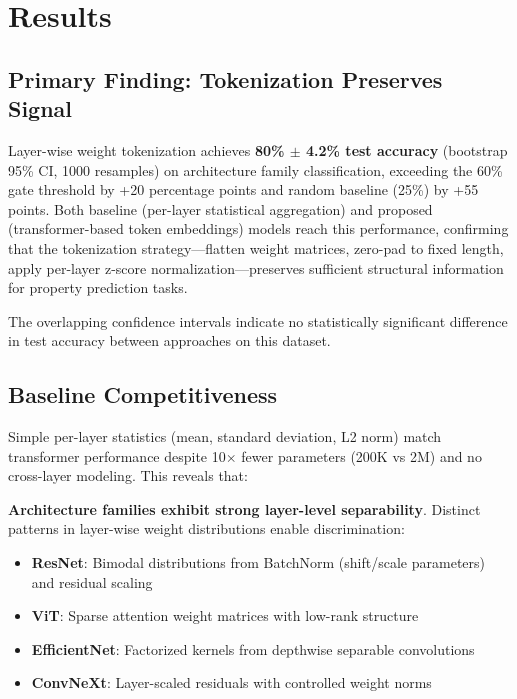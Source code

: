 \section{Results}

\subsection{Primary Finding: Tokenization Preserves Signal}

Layer-wise weight tokenization achieves \textbf{80\% $\pm$ 4.2\% test accuracy} (bootstrap 95\% CI, 1000 resamples) on architecture family classification, exceeding the 60\% gate threshold by +20 percentage points and random baseline (25\%) by +55 points. Both baseline (per-layer statistical aggregation) and proposed (transformer-based token embeddings) models reach this performance, confirming that the tokenization strategy---flatten weight matrices, zero-pad to fixed length, apply per-layer z-score normalization---preserves sufficient structural information for property prediction tasks.

The overlapping confidence intervals indicate no statistically significant difference in test accuracy between approaches on this dataset.

\subsection{Baseline Competitiveness}

Simple per-layer statistics (mean, standard deviation, L2 norm) match transformer performance despite 10$\times$ fewer parameters (200K vs 2M) and no cross-layer modeling. This reveals that:

\textbf{Architecture families exhibit strong layer-level separability}. Distinct patterns in layer-wise weight distributions enable discrimination:

\begin{itemize}
\item \textbf{ResNet}: Bimodal distributions from BatchNorm (shift/scale parameters) and residual scaling
\item \textbf{ViT}: Sparse attention weight matrices with low-rank structure
\item \textbf{EfficientNet}: Factorized kernels from depthwise separable convolutions
\item \textbf{ConvNeXt}: Layer-scaled residuals with controlled weight norms
\end{itemize}

